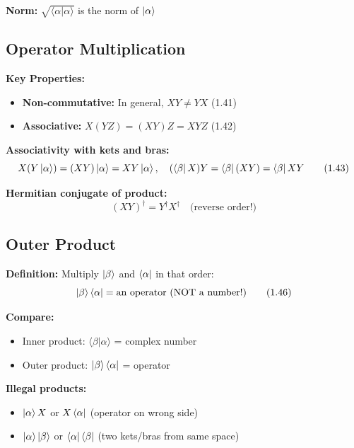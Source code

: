 \documentclass[11pt,a4paper]{article}
\begin{document}
\textbf{Norm:} $\sqrt{\langle\alpha|\alpha\rangle}$ is the norm of $\ket{\alpha}$

\subsection{Operator Multiplication}

\textbf{Key Properties:}
\begin{itemize}
\item \textbf{Non-commutative:} In general, $XY \neq YX$ \hfill (1.41)
\item \textbf{Associative:} $X(YZ) = (XY)Z = XYZ$ \hfill (1.42)
\end{itemize}

\textbf{Associativity with kets and bras:}
\begin{equation}
X(Y\ket{\alpha}) = (XY)\ket{\alpha} = XY\ket{\alpha}, \quad (\bra{\beta}X)Y = \bra{\beta}(XY) = \bra{\beta}XY
\tag{1.43}
\end{equation}

\textbf{Hermitian conjugate of product:}
\begin{equation}
(XY)^\dagger = Y^\dagger X^\dagger \quad \text{(reverse order!)}
\tag{1.44}
\end{equation}

\subsection{Outer Product}

\textbf{Definition:} Multiply $\ket{\beta}$ and $\bra{\alpha}$ in that order:
\begin{equation}
\ket{\beta}\bra{\alpha} = \text{an operator (NOT a number!)}
\tag{1.46}
\end{equation}

\textbf{Compare:}
\begin{itemize}
\item Inner product: $\langle\beta|\alpha\rangle$ = complex number
\item Outer product: $\ket{\beta}\bra{\alpha}$ = operator
\end{itemize}

\textbf{Illegal products:}
\begin{itemize}
\item $\ket{\alpha}X$ or $X\bra{\alpha}$ (operator on wrong side)
\item $\ket{\alpha}\ket{\beta}$ or $\bra{\alpha}\bra{\beta}$ (two kets/bras from same space)
\end{itemize}
\end{document}
